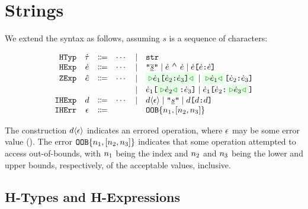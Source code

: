 \documentclass[12pt]{article}
\begin{document}
\section{Strings}
We extend the syntax as follows, assuming $s$ is a sequence of characters:
%
\begin{center}
  \vspace*{-1.5em}
  \[\begin{array}{rccccl}
    \HTyp     & \HTypVar     & \Coloneqq & \cdots & \mid & \HTypStr                                                  \\
    \HExp     & \HExpVar     & \Coloneqq & \cdots & \mid & \HExpStrLit 
                                               \mid   \HExpStrConcat{\HExpVar}{\HExpVar}
                                               \mid   \HExpStrSub{\HExpVar}{\HExpVar}{\HExpVar} \\
    \ZExp     & \ZExpVar     & \Coloneqq & \cdots & \mid & \ZExpStrSub{\HExpVar_1}{\HExpVar_2}{\HExpVar_3} 
                                               \mid   \ZExpStrSubI{\HExpVar_1}{\HExpVar_2}{\HExpVar_3} \\
              &              &           &   & \mid & \ZExpStrSubII{\HExpVar_1}{\HExpVar_2}{\HExpVar_3}
                                               \mid   \ZExpStrSubIII{\HExpVar_1}{\HExpVar_2}{\HExpVar_3} \\
    \IHExp    & \IHExpVar    & \Coloneqq & \cdots & \mid & \IHExpCastExceptVar{\IHExpVar}
                                               \mid   \IHExpStrLit 
                                               \mid   \IHExpStrSub{\IHExpVar}{\IHExpVar}{\IHExpVar} \\
    \IHExcept & \IHExceptVar & \Coloneqq &   &   & \IHExceptOOB{\IHExpNumLitVS{1}}{\IHExpNumLitVS{2}}{\IHExpNumLitVS{3}}
  \end{array}\]
\end{center}
%
The \IHExp{} construction $d \langle \epsilon \rangle$ indicates an errored operation, where
$\epsilon$ may be some error value (\IHExcept{}).
%
The error $\texttt{OOB}\{n_1, [n_2, n_3]\}$ indicates that
some operation attempted to access out-of-bounds, with $n_1$ being the index and
$n_2$ and $n_3$ being the lower and upper bounds, respectively, of the
acceptable values, inclusive.
\subsection{H-Types and H-Expressions}
\end{document}
